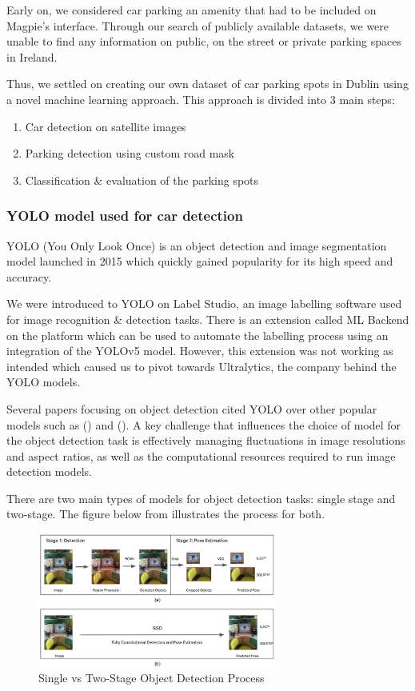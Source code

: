 Early on, we considered car parking an amenity that had to be included on
Magpie's interface. Through our search of publicly available datasets, we were
unable to find any information on public, on the street or private parking
spaces in Ireland.

Thus, we settled on creating our own dataset of car parking spots in Dublin
using a novel machine learning approach.
This approach is divided into 3 main steps:
\begin{enumerate}
  \item Car detection on satellite images
  \item Parking detection using custom road mask
  \item Classification \& evaluation of the parking spots
\end{enumerate}
\subsubsection{YOLO model used for car detection}
YOLO (You Only Look Once) is an object detection and image segmentation model
launched in 2015 which quickly gained popularity for its high speed and
accuracy.

We were introduced to YOLO on Label Studio, an image labelling software used for
image recognition \& detection tasks. There is an extension called ML Backend on
the platform which can be used to automate the labelling process using an
integration of the YOLOv5 model. However, this extension was not working as
intended which caused us to pivot towards Ultralytics, the company behind the
YOLO models.

Several papers focusing on object detection cited YOLO over other popular models
such as (\cite{firedetectionyolo}) and (\cite{polypdetectionyolo}). A key
challenge that influences the choice of model for the object detection task is
effectively managing fluctuations in image resolutions and aspect ratios, as
well as the computational resources required to run image detection models.

There are two main types of models for object detection tasks: single stage and
two-stage. The figure below from \cite{singlevstwodetectorimg} illustrates the
process for both.

\begin{figure}[htbp]
  \centering
  \includegraphics[width=0.7\textwidth]{images/single-vs-two-stage-obj-detector.png}
  \caption{Single vs Two-Stage Object Detection Process}
\end{figure}

